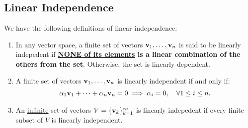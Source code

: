 \subsection{Linear Independence}
\begin{definition}
	We have the following definitions of linear independence:
	\begin{enumerate}	
		\item In any vector space, a finite set of vectors ${\bf v}_1, \dots, {\bf v}_n$ is said to be linearly indepedent if \textup{\textbf{\underline{NONE of its elements} is a linear combination of the others from the set}}. Otherwise, the set is linearly dependent.
		\item A finite set of vectors ${\bf v}_1, \dots, {\bf v}_n$ is linearly independent if and only if:
		\begin{align*}
			\alpha_1{\bf v}_1 + \dots + \alpha_n{\bf v}_n = 0 \implies \alpha_i = 0, \quad \forall 1\le i\le n.	
		\end{align*} 

		\item An \underline{infinite} set of vectors $V=\{{\bf v}_k\}_{k=1}^\infty$ is linearly indepedent if every finite subset of $V$ is linearly independent.
	\end{enumerate} 
\end{definition} 

